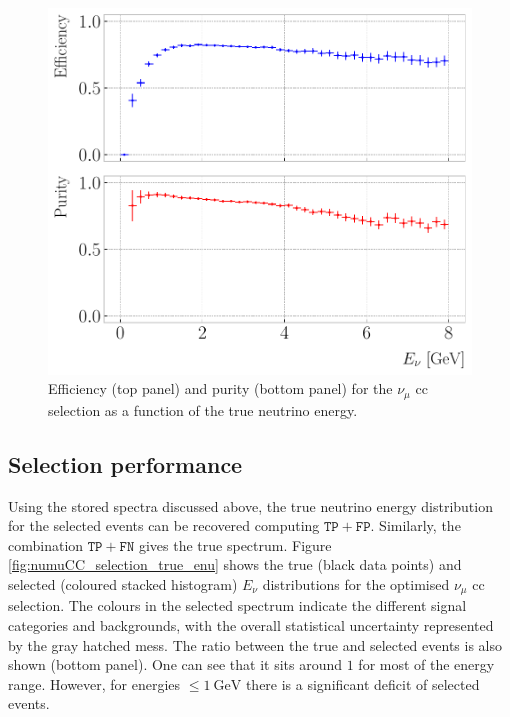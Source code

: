 \begin{figure}[t]
	\centering
	\includegraphics[width=.70\linewidth]{Images/GAr_selection/numuCC_selection_true_energy_performance.pdf}
	\caption[Efficiency and purity for the $\nu_{\mu}$ \gls{cc} selection as a function of the true neutrino energy.]{Efficiency (top panel) and purity (bottom panel) for the $\nu_{\mu}$ \gls{cc} selection as a function of the true neutrino energy.}
	\label{fig:numuCC_selection_true_enu_performance}
\end{figure}

\subsection{Selection performance}

Using the stored spectra discussed above, the true neutrino energy distribution for the selected events can be recovered computing $\mathtt{TP}+\mathtt{FP}$. Similarly, the combination $\mathtt{TP}+\mathtt{FN}$ gives the true spectrum. Figure \ref{fig:numuCC_selection_true_enu} shows the true (black data points) and selected (coloured stacked histogram) $E_{\nu}$ distributions for the optimised $\nu_{\mu}$ \gls{cc} selection. The colours in the selected spectrum indicate the different signal categories and backgrounds, with the overall statistical uncertainty represented by the gray hatched mess. The ratio between the true and selected events is also shown (bottom panel). One can see that it sits around $1$ for most of the energy range. However, for energies $\leq 1~\mathrm{GeV}$ there is a significant deficit of selected events.

